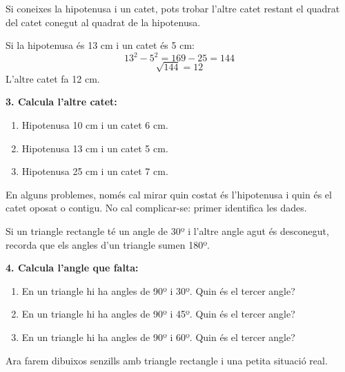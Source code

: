 \documentclass[12pt,a4paper]{article}
\begin{document}
\begin{capsula}
Si coneixes la hipotenusa i un catet, pots trobar l'altre catet restant el quadrat del catet conegut al quadrat de la hipotenusa.
\end{capsula}

\begin{exemple}
Si la hipotenusa és 13 cm i un catet és 5 cm:
\[
13^2-5^2=169-25=144
\]
\[
\sqrt{144}=12
\]
L'altre catet fa 12 cm.
\end{exemple}

\textbf{3. Calcula l'altre catet:}
\begin{enumerate}[label=\alph*)]
    \item Hipotenusa 10 cm i un catet 6 cm. \vspace{1cm}
    \item Hipotenusa 13 cm i un catet 5 cm. \vspace{1cm}
    \item Hipotenusa 25 cm i un catet 7 cm. \vspace{1cm}
\end{enumerate}

\begin{capsula}
En alguns problemes, només cal mirar quin costat és l'hipotenusa i quin és el catet oposat o contigu. No cal complicar-se: primer identifica les dades.
\end{capsula}

\begin{exemple}
Si un triangle rectangle té un angle de 30º i l'altre angle agut és desconegut, recorda que els angles d'un triangle sumen 180º.
\end{exemple}

\textbf{4. Calcula l'angle que falta:}
\begin{enumerate}[label=\alph*)]
    \item En un triangle hi ha angles de 90º i 30º. Quin és el tercer angle? \vspace{1cm}
    \item En un triangle hi ha angles de 90º i 45º. Quin és el tercer angle? \vspace{1cm}
    \item En un triangle hi ha angles de 90º i 60º. Quin és el tercer angle? \vspace{1cm}
\end{enumerate}

\begin{capsula}
Ara farem dibuixos senzills amb triangle rectangle i una petita situació real.
\end{capsula}
\end{document}
